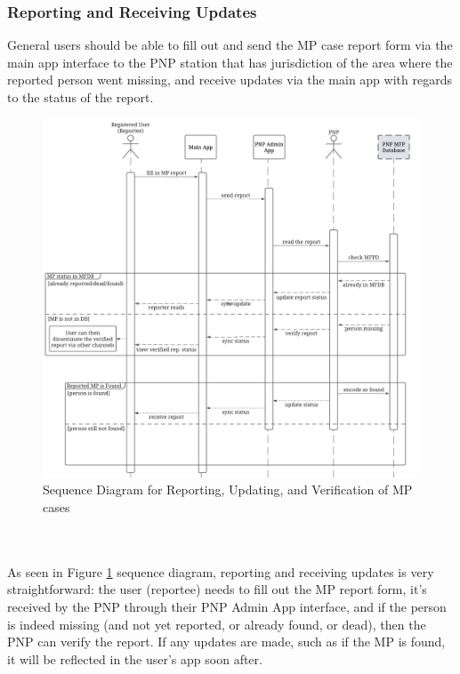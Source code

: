 \subsubsection{Reporting and Receiving Updates}
General users should be able to fill out and send the MP case report form via the main app interface to the PNP station that has jurisdiction of the area where the reported person went missing, and receive updates via the main app with regards to the status of the report.

\begin{figure}[!h]
    \centering
    \includegraphics{figures/Chapter3/Chapt3_seqDiag_report.jpeg}
    \caption{Sequence Diagram for Reporting, Updating, and Verification of MP cases}
    \label{fig:seqDiaReport}
\end{figure}
\\\\As seen in Figure \ref{fig:seqDiaReport} sequence diagram, reporting and receiving updates is very straightforward: the user (reportee) needs to fill out the MP report form, it’s received by the PNP through their PNP Admin App interface, and if the person is indeed missing (and not yet reported, or already found, or dead), then the PNP can verify the report. If any updates are made, such as if the MP is found, it will be reflected in the user’s app soon after.

